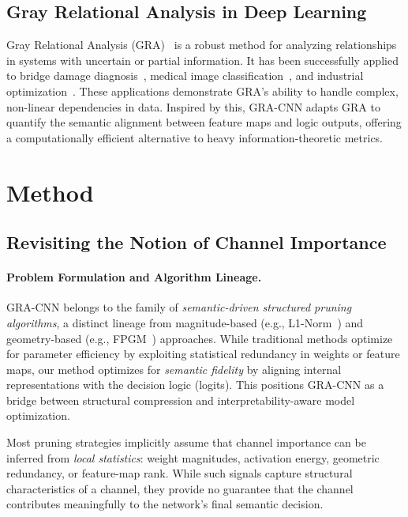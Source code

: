 \documentclass[sn-mathphys,Numbered]{sn-jnl}
\begin{document}
\subsection{Gray Relational Analysis in Deep Learning}
Gray Relational Analysis (GRA)~\cite{deng1989gra} is a robust method for analyzing relationships in systems with uncertain or partial information. It has been successfully applied to bridge damage diagnosis~\cite{xiao2021novel}, medical image classification~\cite{pal2021improved}, and industrial optimization~\cite{wang2024integration,hamdi2023application}. These applications demonstrate GRA's ability to handle complex, non-linear dependencies in data. Inspired by this, GRA-CNN adapts GRA to quantify the semantic alignment between feature maps and logic outputs, offering a computationally efficient alternative to heavy information-theoretic metrics.

\section{Method}
\label{sec:method}

\subsection{Revisiting the Notion of Channel Importance}

\paragraph{Problem Formulation and Algorithm Lineage.}
GRA-CNN belongs to the family of \emph{semantic-driven structured pruning algorithms}, a distinct lineage from magnitude-based (e.g., L1-Norm~\cite{he2017channel}) and geometry-based (e.g., FPGM~\cite{he2019fpgm}) approaches. While traditional methods optimize for parameter efficiency by exploiting statistical redundancy in weights or feature maps, our method optimizes for \emph{semantic fidelity} by aligning internal representations with the decision logic (logits). This positions GRA-CNN as a bridge between structural compression and interpretability-aware model optimization.

Most pruning strategies implicitly assume that channel importance can be inferred from \emph{local statistics}: weight magnitudes, activation energy, geometric redundancy, or feature-map rank. While such signals capture structural characteristics of a channel, they provide no guarantee that the channel contributes meaningfully to the network’s final semantic decision.
\end{document}

